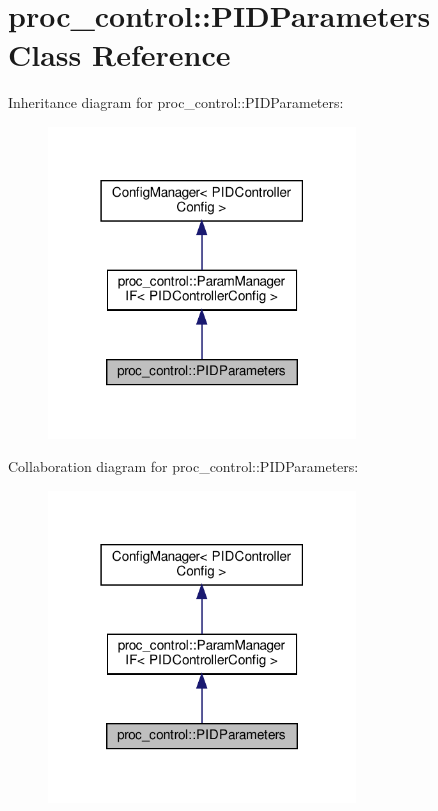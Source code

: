 \hypertarget{classproc__control_1_1_p_i_d_parameters}{}\section{proc\+\_\+control\+:\+:P\+I\+D\+Parameters Class Reference}
\label{classproc__control_1_1_p_i_d_parameters}


Inheritance diagram for proc\+\_\+control\+:\+:P\+I\+D\+Parameters\+:\nopagebreak
\begin{figure}[H]
\begin{center}
\leavevmode
\includegraphics[width=231pt]{classproc__control_1_1_p_i_d_parameters__inherit__graph}
\end{center}
\end{figure}


Collaboration diagram for proc\+\_\+control\+:\+:P\+I\+D\+Parameters\+:\nopagebreak
\begin{figure}[H]
\begin{center}
\leavevmode
\includegraphics[width=231pt]{classproc__control_1_1_p_i_d_parameters__coll__graph}
\end{center}
\end{figure}
